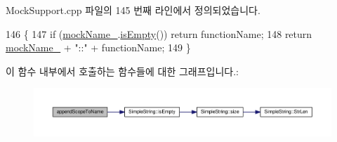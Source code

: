 Mock\+Support.\+cpp 파일의 145 번째 라인에서 정의되었습니다.


\begin{DoxyCode}
146 \{
147     \textcolor{keywordflow}{if} (\hyperlink{class_mock_support_a4ab891b797dea40dc832515765d4ab3e}{mockName\_}.\hyperlink{class_simple_string_a479432127ee77145cc19d6a2d1590821}{isEmpty}()) \textcolor{keywordflow}{return} functionName;
148     \textcolor{keywordflow}{return} \hyperlink{class_mock_support_a4ab891b797dea40dc832515765d4ab3e}{mockName\_} + \textcolor{stringliteral}{"::"} + functionName;
149 \}
\end{DoxyCode}


이 함수 내부에서 호출하는 함수들에 대한 그래프입니다.\+:
\nopagebreak
\begin{figure}[H]
\begin{center}
\leavevmode
\includegraphics[width=350pt]{class_mock_support_a42be7089fa18ff37b9d04b4caae95133_cgraph}
\end{center}
\end{figure}




